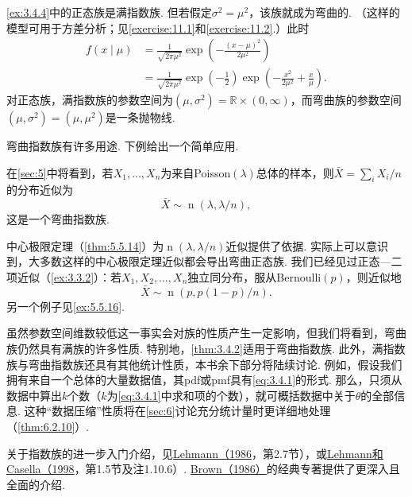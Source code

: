 \begin{example}[一个弯曲指数族]\label{ex:3.4.8}
\autoref{ex:3.4.4}中的正态族是满指数族. 但若假定$\sigma^2=\mu^2$，该族就成为弯曲的. （这样的模型可用于方差分析；见\autoref{exercise:11.1}和\autoref{exercise:11.2}.）此时
\begin{equation}\label{eq:3.4.9}
\begin{aligned}
f(x\mid\mu)&=\frac1{\sqrt{2\pi\mu^2}}\exp\left(-\frac{(x-\mu)^2}{2\mu^2}\right)\\
&=\frac1{\sqrt{2\pi\mu^2}}\exp\left(-\frac12\right)\exp\left(-\frac{x^2}{2\mu^2}+\frac x\mu\right).
\end{aligned}
\end{equation}
对正态族，满指数族的参数空间为$(\mu,\sigma^2)=\mathbb R\times(0,\infty)$，而弯曲族的参数空间$(\mu,\sigma^2)=(\mu,\mu^2)$是一条抛物线.
\end{example}
弯曲指数族有许多用途. 下例给出一个简单应用.

\begin{example}[正态近似]\label{ex:3.4.9}
在\autoref{sec:5}中将看到，若$X_1,\ldots,X_n$为来自Poisson$(\lambda)$总体的样本，则$\bar X=\sum_iX_i/n$的分布近似为
$$\bar X\sim\operatorname n(\lambda,\lambda/n),$$
这是一个弯曲指数族.

中心极限定理（\autoref{thm:5.5.14}）为$\operatorname n(\lambda,\lambda/n)$近似提供了依据. 实际上可以意识到，大多数这样的中心极限定理近似都会导出弯曲正态族. 我们已经见过正态—二项近似（\autoref{ex:3.3.2}）：若$X_1,X_2,\ldots,X_n$独立同分布，服从Bernoulli$(p)$，则近似地
$$\bar X\sim\operatorname n(p,p(1-p)/n).$$
另一个例子见\autoref{ex:5.5.16}.
\end{example}
虽然参数空间维数较低这一事实会对族的性质产生一定影响，但我们将看到，弯曲族仍然具有满族的许多性质. 特别地，\autoref{thm:3.4.2}适用于弯曲指数族. 此外，满指数族与弯曲指数族还具有其他统计性质，本书余下部分将陆续讨论. 例如，假设我们拥有来自一个总体的大量数据值，其pdf或pmf具有\eqref{eq:3.4.1}的形式. 那么，只须从数据中算出$k$个数（$k$为\eqref{eq:3.4.1}中求和项的个数），就可概括数据中关于$\theta$的全部信息. 这种“数据压缩”性质将在\autoref{sec:6}讨论充分统计量时更详细地处理（\autoref{thm:6.2.10}）.

关于指数族的进一步入门介绍，见\hyperref[bib:source198]{Lehmann（1986}，第2.7节），或\hyperref[bib:source200]{Lehmann和Casella（1998}，第1.5节及注1.10.6）. \hyperref[bib:source50]{Brown（1986）}的经典专著提供了更深入且全面的介绍.
